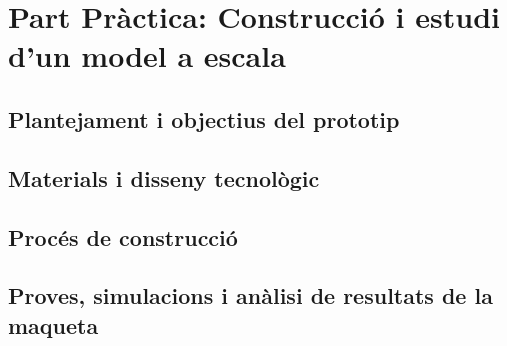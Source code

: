 \chapter{Part Pràctica: Construcció i estudi d'un model a escala}
\section{Plantejament i objectius del prototip}

\section{Materials i disseny tecnològic}

\section{Procés de construcció}

\section{Proves, simulacions i anàlisi de resultats de la maqueta}
